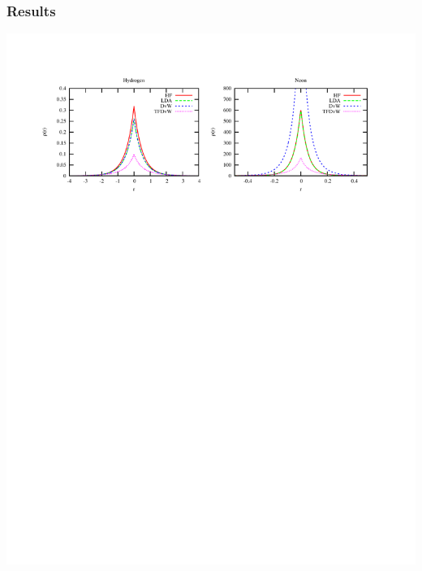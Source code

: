 \documentclass[mathserif, 8pt]{beamer}
\begin{document}
\begin{frame}
    \frametitle{Results}
    \centering
    \includegraphics[scale=0.6, viewport = 50 560 550 755]{figures/of_atoms.pdf}\\

\end{frame}
\end{document}
